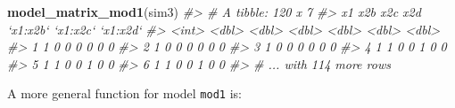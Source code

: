 \documentclass[]{book}
\newenvironment{Shaded}{\begin{snugshade}}{\end{snugshade}}
\newcommand{\CommentTok}[1]{\textcolor[rgb]{0.56,0.35,0.01}{\textit{#1}}}
\newcommand{\ControlFlowTok}[1]{\textcolor[rgb]{0.13,0.29,0.53}{\textbf{#1}}}
\newcommand{\DataTypeTok}[1]{\textcolor[rgb]{0.13,0.29,0.53}{#1}}
\newcommand{\KeywordTok}[1]{\textcolor[rgb]{0.13,0.29,0.53}{\textbf{#1}}}
\newcommand{\NormalTok}[1]{#1}
\newcommand{\OperatorTok}[1]{\textcolor[rgb]{0.81,0.36,0.00}{\textbf{#1}}}
\newcommand{\StringTok}[1]{\textcolor[rgb]{0.31,0.60,0.02}{#1}}
\theoremstyle{plain}
\theoremstyle{remark}
\begin{document}
\begin{Shaded}
\begin{Highlighting}[]
\KeywordTok{model_matrix_mod1}\NormalTok{(sim3)}
\CommentTok{#> # A tibble: 120 x 7}
\CommentTok{#>      x1   x2b   x2c   x2d `x1:x2b` `x1:x2c` `x1:x2d`}
\CommentTok{#>   <int> <dbl> <dbl> <dbl>    <dbl>    <dbl>    <dbl>}
\CommentTok{#> 1     1     0     0     0        0        0        0}
\CommentTok{#> 2     1     0     0     0        0        0        0}
\CommentTok{#> 3     1     0     0     0        0        0        0}
\CommentTok{#> 4     1     1     0     0        1        0        0}
\CommentTok{#> 5     1     1     0     0        1        0        0}
\CommentTok{#> 6     1     1     0     0        1        0        0}
\CommentTok{#> # ... with 114 more rows}
\end{Highlighting}
\end{Shaded}

\begin{Shaded}
\end{Shaded}

A more general function for model \texttt{mod1} is:
\end{document}
